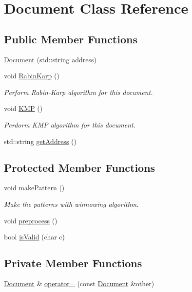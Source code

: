 \hypertarget{class_document}{}\section{Document Class Reference}
\label{class_document}
\subsection*{Public Member Functions}
\begin{DoxyCompactItemize}
\item 
\hyperlink{class_document_ad6f3eb7808d3d6ad6f40e5b64a3317bc}{Document} (std::string address)
\item 
void \hyperlink{class_document_a607bc11ebda64c08fd22c8ca7aa373d3}{RabinKarp} ()
\begin{DoxyCompactList}\small\item\em Perform Rabin-\/Karp algorithm for this document. \end{DoxyCompactList}\item 
void \hyperlink{class_document_aa02349519b475996d1206dfbbcaab349}{KMP} ()
\begin{DoxyCompactList}\small\item\em Perdorm KMP algorithm for this document. \end{DoxyCompactList}\item 
std::string \hyperlink{class_document_aba3c51ac1b4cb63dd9235aaa9e5ab6f0}{getAddress} ()
\end{DoxyCompactItemize}
\subsection*{Protected Member Functions}
\begin{DoxyCompactItemize}
\item 
void \hyperlink{class_document_a019a44be44bd7b548ea32e4c699bed49}{makePattern} ()
\begin{DoxyCompactList}\small\item\em Make the patterns with winnowing algorithm. \end{DoxyCompactList}\item 
void \hyperlink{class_document_a508bc7255ec6ddf96d0d7078ff0d1229}{preprocess} ()
\item 
bool \hyperlink{class_document_ae81119fe62cb6c73bff4c9283c97884f}{isValid} (char c)
\end{DoxyCompactItemize}
\subsection*{Private Member Functions}
\begin{DoxyCompactItemize}
\item 
\hyperlink{class_document}{Document} \& \hyperlink{class_document_a4ccdb9185bd311793ad385564553153c}{operator=} (const \hyperlink{class_document}{Document} \&other)
\end{DoxyCompactItemize}
